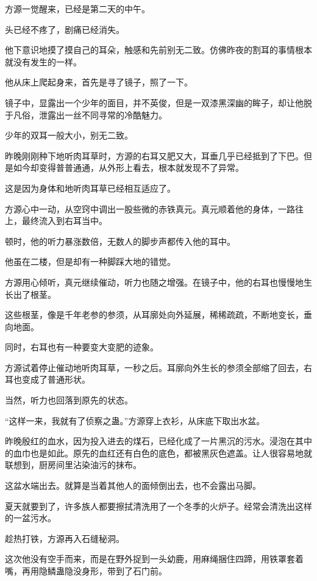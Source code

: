 
\begin{this_body}

方源一觉醒来，已经是第二天的中午。

头已经不疼了，剧痛已经消失。

他下意识地摸了摸自己的耳朵，触感和先前别无二致。仿佛昨夜的割耳的事情根本就没有发生的一样。

他从床上爬起身来，首先是寻了镜子，照了一下。

镜子中，显露出一个少年的面目，并不英俊，但是一双漆黑深幽的眸子，却让他脱于凡俗，泄露出一丝不同寻常的冷酷魅力。

少年的双耳一般大小，别无二致。

昨晚刚刚种下地听肉耳草时，方源的右耳又肥又大，耳垂几乎已经抵到了下巴。但是如今却变得普普通通，从外形上看去，根本就发现不了异常。

这是因为身体和地听肉耳草已经相互适应了。

方源心中一动，从空窍中调出一股些微的赤铁真元。真元顺着他的身体，一路往上，最终流入到右耳当中。

顿时，他的听力暴涨数倍，无数人的脚步声都传入他的耳中。

他虽在二楼，但是却有一种脚踩大地的错觉。

方源用心倾听，真元继续催动，听力也随之增强。在镜子中，他的右耳也慢慢地生长出了根茎。

这些根茎，像是千年老参的参须，从耳廓处向外延展，稀稀疏疏，不断地变长，垂向地面。

同时，右耳也有一种要变大变肥的迹象。

方源试着停止催动地听肉耳草，一秒之后。耳廓向外生长的参须全部缩了回去，右耳也变成了普通形状。

当然，听力也回落到原先的状态。

“这样一来，我就有了侦察之蛊。”方源穿上衣衫，从床底下取出水盆。

昨晚殷红的血水，因为投入进去的煤石，已经化成了一片黑沉的污水。浸泡在其中的血巾也是如此。原先的血红还有白色的底色，都被黑灰色遮盖。让人很容易地就联想到，厨房间里沾染油污的抹布。

这盆水端出去。就算是当着其他人的面倾倒出去，也不会露出马脚。

夏天就要到了，许多族人都要擦拭清洗用了一个冬季的火炉子。经常会清洗出这样的一盆污水。

趁热打铁，方源再入石缝秘洞。

这次他没有空手而来，而是在野外捉到一头幼鹿，用麻绳捆住四蹄，用铁罩套着嘴，再用隐鳞蛊隐没身形，带到了石门前。


\end{this_body}
